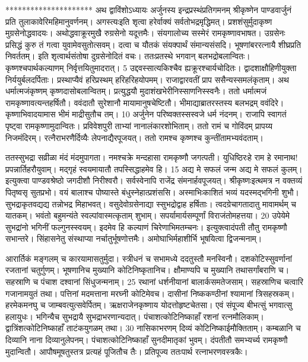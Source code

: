 *********************
अथ द्वाविंशोऽध्यायः अर्जुनस्य इन्द्रप्रस्थंप्रतिगमनम् श्रीकृष्णेन पाण्डवार्जुनं प्रति तुलाकावेरिमहिमानुवर्णनम्।
 अगस्त्यःइति शृत्वा हरेर्वाक्यं सर्वतोभद्रमृद्धिमत्।
 प्रशशंसुर्मुदाकृष्ण मुग्रसेनोद्धवादयः।
 अथोद्धवाक्रूरमुखै रुग्रसेनो यदूत्तमैः।
 संयगालोच्य सस्मेरं रामकृष्णावभाषत।
 उग्रसेनः
प्रसिद्धं कुरु तं गत्वा युवामेवसुतोत्सवम्।
 दत्वा च यौतकं संयक्पार्थं संमान्यसंसदि।
 भूषणांबररत्नायै शीघ्रप्रति निवर्ततम्।
 इति शृत्वार्थसंतोषा दुग्रसेनोदितं वचः।
 ततःप्रतस्थे भगवान् बलभद्रोबलान्वितः।
 कृष्णश्चपार्थकल्याणम् निर्वृत्तयितुमादरात्।
 5 उद्दवस्सात्यकिश्चैव ह्यक्रूरश्चार्यचोदितः।
 द्वादशाक्षौहिणीयुक्ता निर्ययुर्बलदर्पिताः।
 प्रस्थाप्यैवं हरिप्रस्थम् हरिहरिहयोपमम्।
 राजाद्वारवतीं प्राप ससैन्यस्समलंकृताम्।
 अथ धर्मात्मजंकृष्णम् कृष्णदासोबलान्वितम्।
 प्रत्युद्धयौ मुदाशंखभेरीनिस्साणनिस्स्वनैः।
 ततो धर्मात्मजं रामकृष्णावत्यन्तहर्षितौ।
 ववंदातौ सुरेशानौ मायामानुषचेष्टितौ।
 भीमाद्याब्रातरस्तस्य बलभद्रम् ववंदिरे।
 कृष्णाभिवादयामास भीमं माद्रीसुतौच तम्।
 10 अर्जुनेन परिष्वक्तस्सस्वजे धर्म नंदनम्।
 राजापि स्वागतं पृष्ट्वा रामकृष्णामुदान्वितः।
 प्रविवेशपुरी ताभ्यां नानालंकारशोभिताम्।
 ततो रामं च गोविंदम् प्रापय्य निजमंदिरम्।
 रत्नैराभरणैर्दिव्यैः लेपनाद्यैरपूजयत्।
 ततो रामश्च कृष्णश्च कुन्तींतामभ्यवंदताम्।
 
ततस्सुभद्रा सव्रीळा मंदं मंदमुपागता।
 नमश्चक्रे मन्दहासा रामकृष्णौ जगत्पती।
 युधिष्ठिरःहे राम हे रमानाथ! प्रपन्नार्तिहरौयुवाम्।
 मद्गृहं स्वयमायातौ तपस्सिद्धाहमेव हि।
 15 अद्य मे सफलं जन्म अद्य मे सफलं कुलम्।
 इत्युक्त्वा पाण्डवश्रेष्ठो जगदीशौ निरीश्वरौ।
 सर्वस्वेनापि राजेंद्र संमनार्हवपूजयत्।
 श्रीकृष्णःइत्थमत्र न वक्तव्यं पितृष्वसृ सुतप्रभो।
 वयं बालाश्च पोष्यास्ते बंधुस्नेहात्प्रशंससि।
 अस्माभिःकाशितं भव्यं यदस्मद्भगिनी शुभौ।
 सुभद्राकृतवद्यद्य तन्नोभद्र मिहाभवत्।
 वसुदेवोग्रसेनाद्या स्सुभद्रोद्वाह हर्षिताः।
 त्वदग्रेचागतादातु मावामर्थम् च यातकम्।
 भवंतो बहुमन्यंते स्वल्पांवास्मत्कृताम् शुभाम्।
 सपर्यामार्यसम्पूर्णां विराजंतोमहत्तया।
 20 उपेयेमे सुभद्रांनो भगिनीं फल्गुनस्स्वयम्।
 इदमेव हि कल्याणं चिरेणाभिमतम्चनः।
 इत्युक्त्वादंपती तौतु रामकृष्णौ सभान्तरे।
 सिंहासनेतु संस्थाप्या नर्चातुर्भूषणोत्तमैः।
 अमोघाभिर्महाशीर्भि भूषयित्वा द्विजन्मनाम्।
 
आरार्तिकं मङ्गलम् च कारयामासतुर्मुदा।
 स्त्रीधनं च सभामध्ये ददतुस्तौ मनस्विनौ।
 दशकोटिस्सुवर्णानां रजतानां चतुर्गुणम्।
 भूषणानिच मुख्यानि कोटिनिष्कृतानिच।
 क्षौमाण्यपि च मुख्यानि तथासर्गांबराणि च।
 सहस्राणि च पंचाश दश्वानां सिंधुजन्मनाम्।
 25 रथानां धर्शनीयानां बालार्कसमतेजसाम्।
 सहस्राणिच चत्वारि गजानामयुतं तथा।
 पत्तिनां मदमत्ताना मरघ्नी कोटिमेवच।
 दासीनां निष्ककण्ठीनां श्यामानां त्रिसहस्रकम्।
 हरमेकमनघु च जाम्बवत्युत्सवेर्पितम्।
 ऋक्षराजेनकृष्णाय योदत्तोहृष्टचेतसा।
 एवं संपूज्य बीभत्सुं भगवात्सु हलायुधः।
 भगिन्यैच सुभद्रायै सुभद्राभरणान्यदात्।
 पंचाशत्कोटिनिष्काहाँ रशनां रत्नमौलिकाम्।
 द्वात्रिंशत्कोटिनिष्काहाँ ताटंकयुगळम् तथा।
 30 नासिकाभरणम् दिव्यं कोटिनिष्काईमौक्तिताम्।
 कम्बळानि च दिव्यानि नाना दिव्यानुलेपनम्।
 पंचाशत्कोटिनिष्काहाँ सुनदीमातृकां भुवम्।
 दंपतीतौ समभ्यर्च्य रामकृष्णौ मुदान्वितौ।
 आपौषमूषतुस्तत्र प्रत्यहं पूजितौच तैः।
 प्रतिपूज्य ततःपार्थ रत्नाभरणवस्त्रकैः।
 
